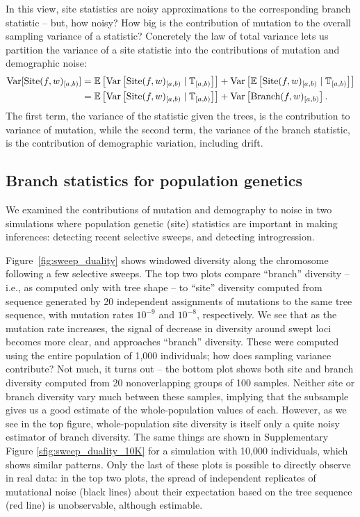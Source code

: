\documentclass{article}
\newcommand{\branch}{\mbox{Branch}} %
\newcommand{\site}{\mbox{Site}} %
\newcommand{\given}{\;\vert\;}
\newcommand{\treeseq}{\mathbb{T}} %
\newcommand{\iw}{w} %
\begin{document}
In this view,
site statistics are noisy approximations to the corresponding branch statistic
-- but, how noisy?
How big is the contribution of mutation to the overall sampling variance of a statistic?
Concretely the law of total variance lets us partition the variance of a site statistic
into the contributions of mutation and demographic noise:
\begin{align*}
    \var[\site(f, \iw)_{[a,b)}]
    &=
        \E\left[ \var\left[\site(f, \iw)_{[a,b)} \given \treeseq_{[a,b)}\right] \right]
        + \var\left[ \E\left[\site(f, \iw)_{[a,b)} \given \treeseq_{[a,b)}\right] \right] \\
    &=
        \E\left[ \var\left[\site(f, \iw)_{[a,b)} \given \treeseq_{[a,b)}\right] \right]
        + \var\left[ \branch(f, \iw)_{[a,b)} \right] .
\end{align*}
The first term, the variance of the statistic given the trees,
is the contribution to variance of mutation,
while the second term, the variance of the branch statistic,
is the contribution of demographic variation, including drift.


\subsection*{Branch statistics for population genetics}

We examined the contributions of mutation and demography to noise
in two simulations where population genetic (site) statistics
are important in making inferences:
detecting recent selective sweeps,
and detecting introgression.

Figure~\ref{fig:sweep_duality} shows windowed
diversity along the chromosome following a few selective sweeps.
The top two plots compare ``branch'' diversity -- i.e., as computed only with tree shape --
to ``site'' diversity computed from sequence generated by 20 independent assignments of mutations to the same tree sequence,
with mutation rates $10^{-9}$ and $10^{-8}$, respectively.
We see that as the mutation rate increases, the signal of decrease in diversity around swept loci becomes more clear,
and approaches ``branch'' diversity.
These were computed using the entire population of 1,000 individuals;
how does sampling variance contribute?
Not much, it turns out -- the bottom plot shows both site and branch diversity
computed from 20 nonoverlapping groups of 100 samples.
Neither site or branch diversity vary much between these samples,
implying that the subsample gives us a good estimate of the whole-population values of each.
However, as we see in the top figure,
whole-population site diversity is itself only a quite noisy estimator of branch diversity.
The same things are shown in Supplementary Figure \ref{sfig:sweep_duality_10K}
for a simulation with 10,000 individuals, which shows similar patterns.
Only the last of these plots is possible to directly observe in real data:
in the top two plots,
the spread of independent replicates of mutational noise (black lines)
about their expectation based on the tree sequence (red line)
is unobservable, although estimable.
\end{document}
